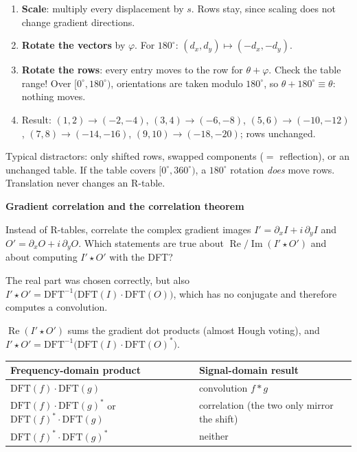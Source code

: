 \documentclass[11pt,a4paper]{article}
\newcommand{\keep}[1]{\par
  \ifdim\dimexpr\pagegoal-\pagetotal\relax<#1\relax\newpage\fi}
\newcommand{\sub}[1]{\keep{6cm}\medskip
  {\sffamily\bfseries\large\color{accent}#1}\par\smallskip}
\begin{document}
\begin{steps}
\begin{enumerate}[leftmargin=*]
  \item \textbf{Scale}: multiply every displacement by $s$. Rows stay, since
        scaling does not change gradient directions.
  \item \textbf{Rotate the vectors} by $\varphi$. For $180^\circ$:
        $(d_x,d_y)\mapsto(-d_x,-d_y)$.
  \item \textbf{Rotate the rows}: every entry moves to the row for $\theta+\varphi$.
        Check the table range! Over $[0^\circ,180^\circ)$, orientations are taken
        modulo $180^\circ$, so $\theta+180^\circ\equiv\theta$: nothing moves.
  \item Result: $(1,2)\to(-2,-4)$, $(3,4)\to(-6,-8)$, $(5,6)\to(-10,-12)$,
        $(7,8)\to(-14,-16)$, $(9,10)\to(-18,-20)$; rows unchanged.
\end{enumerate}
\end{steps}

\begin{hook}
Typical distractors: only shifted rows, swapped components ($=$ reflection), or
an unchanged table. If the table covers $[0^\circ,360^\circ)$, a $180^\circ$ rotation
\emph{does} move rows. Translation never changes an R-table.
\end{hook}

\sub{Gradient correlation and the correlation theorem}

\begin{question}
Instead of R-tables, correlate the complex gradient images
$I' = \partial_x I + i\,\partial_y I$ and $O' = \partial_x O + i\,\partial_y O$.
Which statements are true about $\operatorname{Re}/\operatorname{Im}(I'\star O')$
and about computing $I'\star O'$ with the DFT?
\end{question}
\begin{yours}
The real part was chosen correctly, but also
$I'\star O' = \mathrm{DFT}^{-1}\bigl(\mathrm{DFT}(I)\cdot\mathrm{DFT}(O)\bigr)$,
which has no conjugate and therefore computes a convolution.
\end{yours}
\begin{correct}
$\operatorname{Re}(I'\star O')$ sums the gradient dot products (almost Hough
voting), and
$I'\star O' = \mathrm{DFT}^{-1}\bigl(\mathrm{DFT}(I)\cdot\mathrm{DFT}(O)^*\bigr)$.
\end{correct}

\begin{center}\small
\begin{tabular}{@{}ll@{}}
  \toprule
  Frequency-domain product & Signal-domain result \\
  \midrule
  $\mathrm{DFT}(f)\cdot\mathrm{DFT}(g)$ & convolution $f*g$ \\
  $\mathrm{DFT}(f)\cdot\mathrm{DFT}(g)^*$ or $\mathrm{DFT}(f)^*\cdot\mathrm{DFT}(g)$ & correlation (the two only mirror the shift) \\
  $\mathrm{DFT}(f)^*\cdot\mathrm{DFT}(g)^*$ & neither \\
  \bottomrule
\end{tabular}
\end{center}
\end{document}

